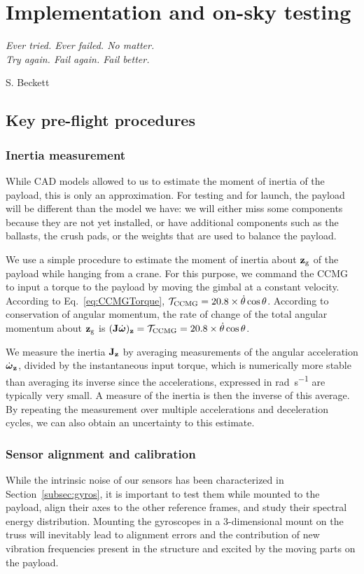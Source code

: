 
\chapter[Implementation and on-sky testing]{Implementation and on-sky testing} %
\label{chap:implementation}

\epigraph{\small\itshape Ever tried. Ever failed. No matter. \\ Try again. Fail again. Fail better.}{S. Beckett}

\section{Key pre-flight procedures}
\subsection{Inertia measurement}
While CAD models allowed to us to estimate the moment of inertia of the payload, this is only an approximation. For testing and for launch, the payload will be different than the model we have: we will either miss some components because they are not yet installed, or have additional components such as the ballasts, the crush pads, or the weights that are used to balance the payload.

We use a simple procedure to estimate the moment of inertia about $\textrm{\textbf{z}}_{\textrm{g}}$ of the payload while hanging from a crane. For this purpose, we command the CCMG to input a torque to the payload by moving the gimbal at a constant velocity. According to Eq.~\ref{eq:CCMGTorque}, $\mathcal{T}_{\textrm{CCMG}} =  20.8\times \dot{\theta}\cos\theta$. According to conservation of angular momentum, the rate of change of the total angular momentum about $\textrm{\textbf{z}}_{\textrm{g}}$ is $(\textrm{\textbf{J}}\dot{\boldsymbol\omega})_{\textrm{\textbf{z}}} = \mathcal{T}_{\textrm{CCMG}} = 20.8\times \dot{\theta}\cos\theta$.

We measure the inertia $\textrm{\textbf{J}}_{\textrm{\textbf{z}}}$ by averaging measurements of the angular acceleration $\dot{\boldsymbol\omega}_{\textrm{\textbf{z}}}$, divided by the instantaneous input torque, which is numerically more stable than averaging its inverse since the accelerations, expressed in \si{\radian\per\second} are typically very small. A measure of the inertia is then the inverse of this average. By repeating the measurement over multiple accelerations and deceleration cycles, we can also obtain an uncertainty to this estimate.


\subsection{Sensor alignment and calibration}
While the intrinsic noise of our sensors has been characterized in Section~\ref{subsec:gyros}, it is important to test them while mounted to the payload, align their axes to the other reference frames, and study their spectral energy distribution. Mounting the gyroscopes in a 3-dimensional mount on the truss will inevitably lead to alignment errors and the contribution of new vibration frequencies present in the structure and excited by the moving parts on the payload.


